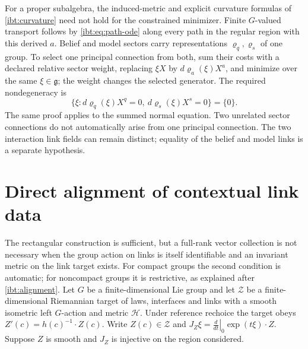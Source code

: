 For a proper subalgebra, the induced-metric and explicit curvature formulas of \cref{ibt:curvature} need not hold for the constrained minimizer. Finite $G$-valued transport follows by \cref{ibt:eq:path-ode} along every path in the regular region with this derived $a$. Belief and model sectors carry representations $\varrho_q,\varrho_s$ of one group. To select one principal connection from both, sum their costs with a declared relative sector weight, replacing $\xi X$ by $d\varrho_a(\xi)X^a$, and minimize over the same $\xi\in\mathfrak g$; the weight changes the selected generator. The required nondegeneracy is
\begin{equation}
 \{\xi:d\varrho_q(\xi)X^q=0,
       \ d\varrho_s(\xi)X^s=0\}=\{0\}.
\end{equation}
The same proof applies to the summed normal equation. Two unrelated sector connections do not automatically arise from one principal connection. The two interaction link fields can remain distinct; equality of the belief and model links is a separate hypothesis.

\section{Direct alignment of contextual link data}
\label{ibt:sec:alignment}

The rectangular construction is sufficient, but a full-rank vector collection is not necessary when the group action on links is itself identifiable and an invariant metric on the link target exists. For compact groups the second condition is automatic; for noncompact groups it is restrictive, as explained after \cref{ibt:alignment}. Let $G$ be a finite-dimensional Lie group and let $\mathcal Z$ be a finite-dimensional Riemannian target of laws, interfaces and links with a smooth isometric left $G$-action and metric $\mathcal H$. Under reference rechoice the target obeys $Z'(c)=h(c)^{-1}\cdot Z(c)$. Write $Z(c)\in\mathcal Z$ and $J_Z\xi=\left.\frac{d}{d t}\right|_0\exp(t\xi)\cdot Z$. Suppose $Z$ is smooth and $J_Z$ is injective on the region considered.

